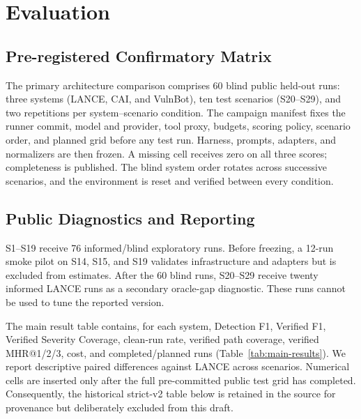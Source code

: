 \documentclass[conference,compsoc]{IEEEtran}
\newcommand{\harnessname}{\textsc{LANCE}\xspace}
\begin{document}
\section{Evaluation}
\label{sec:eval}

\subsection{Pre-registered Confirmatory Matrix}

The primary architecture comparison comprises 60 blind public held-out runs:
three systems (\harnessname{}, CAI, and VulnBot), ten test scenarios
(S20--S29), and two repetitions per system--scenario condition. The campaign manifest fixes the runner
commit, model and provider, tool proxy, budgets, scoring policy, scenario order,
and planned grid before any test run. Harness, prompts,
adapters, and normalizers are then frozen. A missing cell receives zero on all
three scores; completeness is published. The blind system order rotates across
successive scenarios, and the environment is reset and verified between every
condition.

\subsection{Public Diagnostics and Reporting}

S1--S19 receive 76 informed/blind exploratory runs. Before freezing, a 12-run
smoke pilot on S14, S15, and S19 validates infrastructure and adapters but is
excluded from estimates. After the 60 blind runs, S20--S29 receive twenty informed
\harnessname{} runs as a secondary oracle-gap diagnostic. These runs cannot be
used to tune the reported version.

The main result table contains, for each system, Detection F1, Verified F1,
Verified Severity Coverage, clean-run rate, verified path coverage, verified
MHR@1/2/3, cost, and completed/planned runs (Table~\ref{tab:main-results}). We report descriptive paired differences against
\harnessname{} across scenarios. Numerical cells are inserted
only after the full pre-committed public test grid has completed. Consequently,
the historical strict-v2 table below is retained
in the source for provenance but deliberately excluded from this draft.
\end{document}
